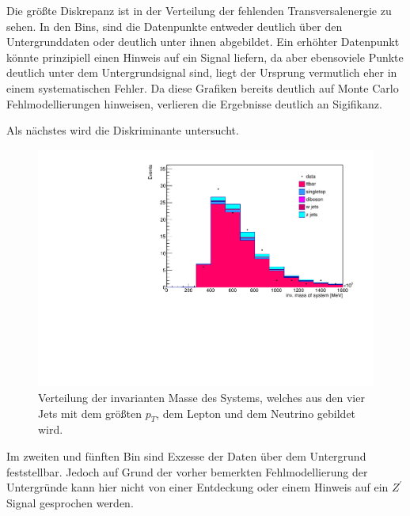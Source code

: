 Die größte Diskrepanz ist in der Verteilung der fehlenden Transversalenergie 
zu sehen. In den Bins, sind die Datenpunkte entweder deutlich über den 
Untergrunddaten oder deutlich unter ihnen abgebildet. Ein erhöhter Datenpunkt könnte 
prinzipiell einen Hinweis auf ein Signal liefern, da aber ebensoviele 
Punkte deutlich unter dem Untergrundsignal sind, liegt der Ursprung vermutlich 
eher in einem systematischen Fehler. Da diese Grafiken bereits deutlich 
auf Monte Carlo Fehlmodellierungen hinweisen, verlieren die Ergebnisse 
deutlich an Sigifikanz. \par 

Als nächstes wird die Diskriminante untersucht.

\begin{figure}[H]
    \centering
    \includegraphics[width=\linewidth]{plots_and_txt/stacked_plots/stacked_disc.pdf}
    \caption{Verteilung der invarianten Masse des Systems, welches aus den vier Jets mit dem größten $p_T$, dem Lepton und dem Neutrino gebildet wird.}
    \label{fig:stacked_disc}
\end{figure}

Im zweiten und fünften Bin sind Exzesse der Daten über dem Untergrund feststellbar. 
Jedoch auf Grund der vorher bemerkten Fehlmodellierung der Untergründe kann 
hier nicht von einer Entdeckung oder einem Hinweis auf ein $Z^\prime$ Signal 
gesprochen werden.